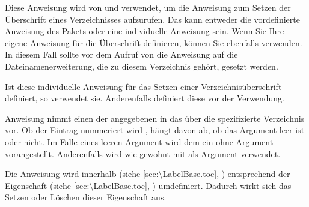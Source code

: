 \begin{Declaration}
\end{Declaration}
Diese Anweisung wird von  und
 verwendet, um die Anweisung zum Setzen
der Überschrift eines Verzeichnisses aufzurufen. Das kann entweder die
vordefinierte Anweisung des Pakets  oder eine individuelle
Anweisung sein. Wenn Sie Ihre eigene Anweisung für die Überschrift definieren,
können Sie ebenfalls  verwenden. In diesem Fall
sollte vor dem Aufruf von  die Anweisung
 auf die
Dateinamenerweiterung, die zu diesem Verzeichnis gehört, gesetzt werden.%
\EndIndexGroup


\begin{Declaration}
\end{Declaration}
Ist diese individuelle Anweisung für das Setzen einer Verzeichnisüberschrift
definiert, so verwendet 
sie. Anderenfalls definiert  diese
vor der Verwendung.%
\EndIndexGroup


\begin{Declaration}
\end{Declaration}
Anweisung
 nimmt einen  der angegebenen
 in das über die  spezifizierte
Verzeichnis vor. Ob der Eintrag nummeriert wird%
, hängt davon ab, ob das Argument  leer ist oder
nicht. Im Falle eines leeren Argument wird dem  ein
 ohne Argument vorangestellt. Anderenfalls wird wie
gewohnt  mit  als
Argument verwendet.

Die Anweisung  wird innerhalb
 (siehe \autoref{sec:\LabelBase.toc},
) entsprechend der Eigenschaft
 (siehe \autoref{sec:\LabelBase.toc},
) umdefiniert. Dadurch wirkt sich das
Setzen oder Löschen dieser Eigenschaft  %
aus.%
%
\EndIndexGroup


